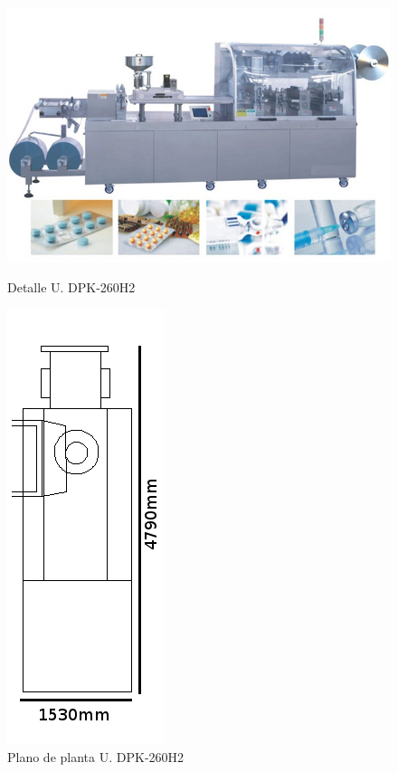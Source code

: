 	\begin{figure}[htp]
		\begin{minipage}{.48\textwidth}
			\centering
			\includegraphics[scale=0.4]{Datasheets/5Foto.png}
			\caption{Detalle U. DPK-260H2}
			\label{fig:testa}
		\end{minipage}
		\begin{minipage}{.48\textwidth}
			\centering
			\includegraphics[scale=0.4]{Datasheets/Miniaturas/blister.png}
			\caption{Plano de planta U. DPK-260H2}
			\label{fig:testb}
		\end{minipage}
	\end{figure}
	
